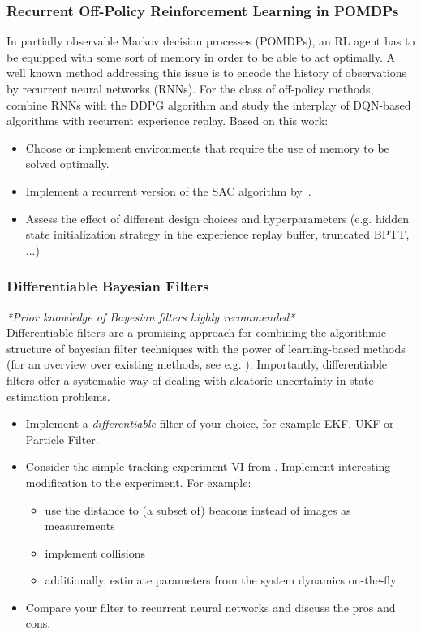 \documentclass[a4paper]{article}
\begin{document}
\subsubsection{Recurrent Off-Policy Reinforcement Learning in POMDPs}
In partially observable Markov decision processes (POMDPs), an RL agent has to be equipped with some sort of memory in order to be able to act optimally. A well known method addressing this issue is to encode the history of observations by recurrent neural networks (RNNs).
For the class of off-policy methods, \citet{heess2015} combine RNNs with the DDPG algorithm and \citet{kapturowski2018} study the interplay of DQN-based algorithms with recurrent experience replay.
Based on this work:
\begin{itemize}
  \item Choose or implement environments that require the use of memory to be solved optimally.
  \item Implement a recurrent version of the SAC algorithm by~\citet{Haarnoja2018a}.
  \item Assess the effect of different design choices and hyperparameters (e.g. hidden state initialization strategy in the experience replay buffer, truncated BPTT, ...)
\end{itemize}

\subsubsection{Differentiable Bayesian Filters}
\textit{*Prior knowledge of Bayesian filters highly recommended*}\\
Differentiable filters are a promising approach for combining the algorithmic structure of bayesian filter techniques with the power of learning-based methods (for an overview over existing methods, see e.g. \citet{kloss2021train}). Importantly, differentiable filters offer a systematic way of dealing with aleatoric uncertainty in state estimation problems.
\begin{itemize}
  \item Implement a \textit{differentiable} filter of your choice, for example EKF, UKF or Particle Filter.
  \item Consider the simple tracking experiment VI from \citet{kloss2021train}. Implement interesting modification to the experiment. For example:
        \begin{itemize}
          \item use the distance to (a subset of) beacons instead of images as measurements
          \item implement collisions
          \item additionally, estimate parameters from the system dynamics on-the-fly
        \end{itemize}
  \item Compare your filter to recurrent neural networks and discuss the pros and cons.
\end{itemize}
\end{document}
